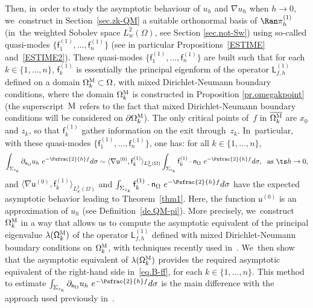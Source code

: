 Then, in~order to study the asymptotic behaviour of $u_h$ and
$\nabla u_h$ when $h\to 0$, we~construct in Section~\ref{sec.zk-QM} a suitable
orthonormal basis of $\Ran \pi_h^{(1)} $ (in~the weighted Sobolev space $L^2_w(\Omega)$, see Section \ref{sec.not-Sw}) using so-called
quasi-modes $\{\mathsf f_1^{(1)}, \ldots, \mathsf f_n^{(1)}\} $ (see
in particular
Propositions~\ref{ESTIME} and~\ref{ESTIME2}). These quasi-modes $\{\mathsf f_1^{(1)}, \ldots, \mathsf
f_n^{(1)}\} $ are built such that for each $k\in \{1,\ldots,n\}$,
$\mathsf f_k^{(1)} $ is essentially the principal eigenform of the
operator $\mathsf L^{(1)}_{f,h}$ defined on a domain
$\Omega_k^{\textsc{M}} \subset \Omega$,
with mixed Dirichlet-Neumann boundary conditions, where the domain $\Omega_k^{\textsc{M}}$ is constructed in Proposition \ref{pr.omegakpoint} (the superscript~${\textsc{M}}$ refers to the fact that mixed Dirichlet-Neumann
boundary conditions will be considered on $\partial
\Omega_k^{\textsc{M}}$). The only critical points of~$f$ in
$\overline{\Omega_k^{\textsc{M}}}$ are $x_0$ and $z_k$, so that
$\mathsf f_k^{(1)}$ gather information on the exit through~$z_k$. In~particular, with these quasi-modes $\{\mathsf f_1^{(1)}, \ldots,
\mathsf f_n^{(1)}\} $, one has: for all $k\in \{1,\ldots,n\}$,\vspace*{-3pt}
\begin{equation}\label{eq.B-ff}
\int_{\Sigma_{z_k}} \partial_{\mathsf n_\Omega}
u_h \ e^{-\Psfrac{2}{h} f} d\sigma
\sim \langle \nabla \mathsf u^{(0)}, \mathsf f_k^{(1)} \rangle_{L^2_w(\Omega)} \int_{\Sigma_{z_k}} \mathsf f_k^{(1)} \cdot \mathsf n_\Omega \ e^{-\Psfrac{2}{h} f} d\sigma, \ \text{ as $\ts h\to 0$,}
\end{equation}
and $\langle \nabla \mathsf u^{(0)}, \mathsf f_k^{(1)} \rangle_{L^2_w(\Omega)}$ and $\int_{\Sigma_{z_k}} \mathsf f_k^{(1)} \cdot \mathsf
n_\Omega \ e^{-\Psfrac{2}{h} f} d\sigma$ have the expected
asymptotic behavior leading to Theorem~\ref{thm1}. Here, the function $\mathsf u^{(0)}$ is an approximation of $u_h$ (see Definition~\ref{de.QM-pi}). More precisely, we~construct $\Omega_k^{\textsc{M}}$ in a way that allows us to \hbox{compute} the asymptotic equivalent of the principal eigenvalue $\lambda(\mathsf
\Omega_k^{\textsc{M}})$ of the operator $\mathsf L^{(1)}_{f,h}$ defined with mixed Dirichlet-Neumann boundary conditions on
$\Omega_k^{\textsc{M}}$, with techniques recently used in~\cite{DoNe2}. We~then show that the asymptotic equivalent of $\lambda(\mathsf
\Omega_k^{\textsc{M}})$ provides the required asymptotic equivalent
of the right-hand side in~\eqref{eq.B-ff}, for each $k\in
\{1,\ldots,n\}$. This method to estimate $\int_{\Sigma_{z_k}} \partial_{\mathsf n_\Omega}
u_h \ e^{-\Psfrac{2}{h} f} d\sigma$
is the main difference with
the approach used previously in~\cite{DLLN}.

